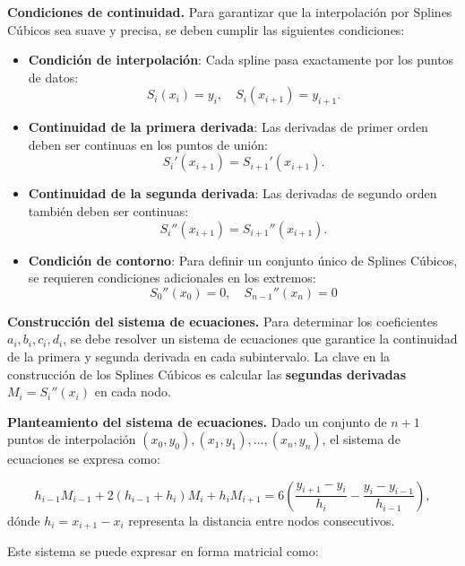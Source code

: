 \documentclass{article}
\begin{document}
\noindent \textbf{Condiciones de continuidad.} Para garantizar que la interpolación por Splines Cúbicos sea suave y precisa, se deben cumplir las siguientes condiciones:
\begin{itemize}
    \item \textbf{Condición de interpolación}: Cada spline pasa exactamente por los puntos de datos:
    $$S_i(x_i) = y_i, \quad S_i(x_{i+1}) = y_{i+1}.$$    
    \item \textbf{Continuidad de la primera derivada}: Las derivadas de primer orden deben ser continuas en los puntos de unión:
    $$ S_i'(x_{i+1}) = S_{i+1}'(x_{i+1}). $$

    \item \textbf{Continuidad de la segunda derivada}: Las derivadas de segundo orden también deben ser continuas:
    $$S_i''(x_{i+1}) = S_{i+1}''(x_{i+1}).$$

    \item \textbf{Condición de contorno}: Para definir un conjunto único de Splines Cúbicos, se requieren condiciones adicionales en los extremos:
    $$
        S_0''(x_0) = 0, \quad S_{n-1}''(x_n) = 0
    $$
\end{itemize}

\noindent \textbf{Construcción del sistema de ecuaciones.}  Para determinar los coeficientes $a_i, b_i, c_i, d_i$, se debe resolver un sistema de ecuaciones que garantice la continuidad de la primera y segunda derivada en cada subintervalo. La clave en la construcción de los Splines Cúbicos es calcular las \textbf{segundas derivadas} $M_i = S_i''(x_i)$ en cada nodo. 

\textbf{Planteamiento del sistema de ecuaciones. } Dado un conjunto de $n+1$ puntos de interpolación $(x_0, y_0), (x_1, y_1), \dots, (x_n, y_n)$, el sistema de ecuaciones se expresa como:

\begin{equation}
    h_{i-1} M_{i-1} + 2(h_{i-1} + h_i) M_i + h_i M_{i+1} = 6 \left( \frac{y_{i+1} - y_i}{h_i} - \frac{y_i - y_{i-1}}{h_{i-1}} \right),
\end{equation}
dónde $h_i = x_{i+1} - x_i$ representa la distancia entre nodos consecutivos.

Este sistema se puede expresar en forma matricial como:
\end{document}

